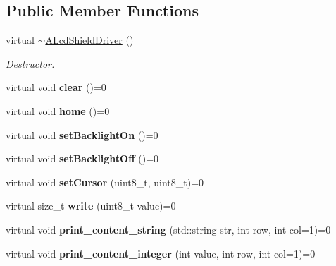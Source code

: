 \subsection*{Public Member Functions}
\begin{DoxyCompactItemize}
\item 
\mbox{\label{classALcdShieldDriver_ae9e14441d24a2b0aa174d5fd2226cebb}} 
virtual \hyperlink{classALcdShieldDriver_ae9e14441d24a2b0aa174d5fd2226cebb}{$\sim$\+A\+Lcd\+Shield\+Driver} ()
\begin{DoxyCompactList}\small\item\em Destructor. \end{DoxyCompactList}\item 
\mbox{\label{classALcdShieldDriver_abffade6296456b829c9ad18571d9e2eb}} 
virtual void {\bfseries clear} ()=0
\item 
\mbox{\label{classALcdShieldDriver_a2ceb8e450d1a8ddcb8d43cebbe3b68af}} 
virtual void {\bfseries home} ()=0
\item 
\mbox{\label{classALcdShieldDriver_a26cb0e3a05c6a6ed614230fb2498aeb9}} 
virtual void {\bfseries set\+Backlight\+On} ()=0
\item 
\mbox{\label{classALcdShieldDriver_ab20d8aa30febd806f37525a9b1dfaa5c}} 
virtual void {\bfseries set\+Backlight\+Off} ()=0
\item 
\mbox{\label{classALcdShieldDriver_a86f33b7de665cbc1936016440a2e2877}} 
virtual void {\bfseries set\+Cursor} (uint8\+\_\+t, uint8\+\_\+t)=0
\item 
\mbox{\label{classALcdShieldDriver_afc3a8efeafe9baf52ef9cdb356189874}} 
virtual size\+\_\+t {\bfseries write} (uint8\+\_\+t value)=0
\item 
\mbox{\label{classALcdShieldDriver_a3b1e771fbf52fe437eacdc1469234a45}} 
virtual void {\bfseries print\+\_\+content\+\_\+string} (std\+::string str, int row, int col=1)=0
\item 
\mbox{\label{classALcdShieldDriver_a00b5fd1cd60be808ed94b8f483c2cd30}} 
virtual void {\bfseries print\+\_\+content\+\_\+integer} (int value, int row, int col=1)=0
\end{DoxyCompactItemize}
